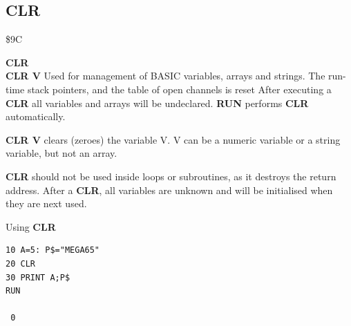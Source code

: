\subsection{CLR}
\begin{description}[leftmargin=2cm,style=nextline]
\item [Token:] \$9C
\item [Format:] {\bf CLR}        \\
                {\bf CLR V}
               Used for management of BASIC variables, arrays
               and strings. The run-time stack pointers,
               and the table of open channels is reset
               After executing a {\bf CLR} all variables and arrays will be undeclared.
               {\bf RUN} performs {\bf CLR} automatically.

               {\bf CLR V} clears (zeroes) the variable V.
               V can be a numeric variable or a string variable, but not
               an array.

\item [Remarks:] {\bf CLR} should not be used inside loops or
               subroutines, as it destroys the return address.
               After a {\bf CLR}, all variables are unknown and will
               be initialised when they are next used.

\item [Example:] Using {\bf CLR}
\begin{tcolorbox}[colback=black,coltext=white]
\verbatimfont{\codefont}
\begin{verbatim}
10 A=5: P$="MEGA65"
20 CLR
30 PRINT A;P$
RUN

 0
\end{verbatim}
\end{tcolorbox}
\end{description}


\newpage
